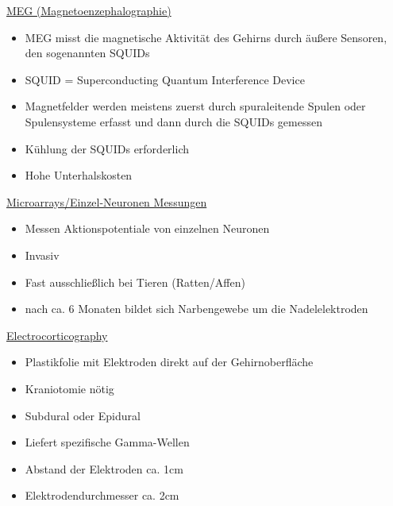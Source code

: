 \documentclass[a4paper,10pt,oneside]{article}
\begin{document}
\underline{MEG (Magnetoenzephalographie)} \\
	\begin{itemize}
		\item MEG misst die magnetische Aktivität des Gehirns durch äußere Sensoren, den sogenannten SQUIDs
		\item SQUID = Superconducting Quantum Interference Device
		\item Magnetfelder werden meistens zuerst durch spuraleitende Spulen oder Spulensysteme erfasst und dann durch die SQUIDs gemessen
		\item Kühlung der SQUIDs erforderlich
		\item Hohe Unterhalskosten
	\end{itemize}
	
\underline{Microarrays/Einzel-Neuronen Messungen} \\
	\begin{itemize}
		\item Messen Aktionspotentiale von einzelnen Neuronen
		\item Invasiv
		\item Fast ausschließlich bei Tieren (Ratten/Affen)
		\item nach ca. 6 Monaten bildet sich Narbengewebe um die Nadelelektroden
	\end{itemize}
	
\underline{Electrocorticography} \\
	\begin{itemize}
		\item Plastikfolie mit Elektroden direkt auf der Gehirnoberfläche
		\item Kraniotomie nötig
		\item Subdural oder Epidural
		\item Liefert spezifische Gamma-Wellen
		\item Abstand der Elektroden ca. 1cm
		\item Elektrodendurchmesser ca. 2cm
	\end{itemize}
	
\end{document}
